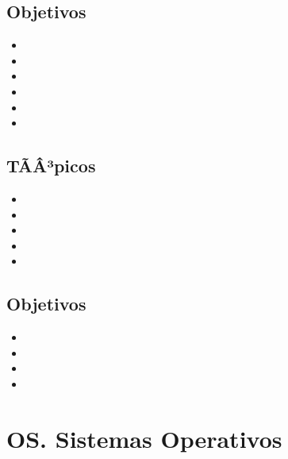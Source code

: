 \subsection*{Objetivos}
\begin{itemize}
	\item \AROCHOObjUNO
	\item \AROCHOObjDOS
	\item \AROCHOObjTRES
	\item \AROCHOObjCUATRO
	\item \AROCHOObjCINCO
	\item \AROCHOObjSEIS
\end{itemize}

\subsection{\ARNUEVEDef}\label{sec:BOK-AR9}

\subsection*{TÃÂ³picos}
\begin{itemize}
	\item \ARNUEVETopicIntroduccion
	\item \ARNUEVETopicDiseno
	\item \ARNUEVETopicImpacto
	\item \ARNUEVETopicComputacion
	\item \ARNUEVETopicMultimedia
\end{itemize}

\subsection*{Objetivos}
\begin{itemize}
	\item \ARNUEVEObjUNO
	\item \ARNUEVEObjDOS
	\item \ARNUEVEObjTRES
	\item \ARNUEVEObjCUATRO
\end{itemize}

\section{OS. Sistemas Operativos}\label{sec:BOK-OS}

\subsection{\OSUNODef}\label{sec:BOK-OS1}
